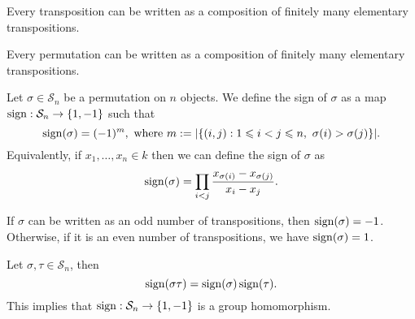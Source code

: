 \begin{proposition}
  Every transposition can be written as a composition of finitely many
  elementary transpositions.
\end{proposition}

\begin{corollary}
  Every permutation can be written as a composition of finitely many elementary
  transpositions.
\end{corollary}

\begin{definition}[Sign]
  \label{def: sign}
  Let \(\sigma \in \mathcal S_n\) be a permutation on \(n\) objects. We define
  the sign of \(\sigma\) as a map \(\operatorname{sign}: \mathcal S_n \to
  \{1, -1\}\) such that
  \[
    \operatorname{sign}(\sigma) = (-1)^m, \text{ where }
    m := |\{(i, j) : 1 \leqslant i < j \leqslant n,\ \sigma(i) > \sigma(j)\}|.
  \]
  Equivalently, if \(x_1, \dots, x_n \in k\) then we can define the
  sign of \(\sigma\) as
  \[
    \operatorname{sign}(\sigma) = \prod_{i < j} \frac{x_{\sigma(i)} -
    x_{\sigma(j)}}{x_i - x_j}.
  \]
\end{definition}

\begin{corollary}
  If \(\sigma\) can be written as an odd number of transpositions, then
  \(\operatorname{sign}(\sigma) = -1\). Otherwise, if it is an even number of
  transpositions, we have \(\operatorname{sign}(\sigma) = 1\).
\end{corollary}

\begin{proposition}\label{prop: sign is a group homomorphism}
  Let \(\sigma, \tau \in \mathcal S_n\), then
  \[
    \operatorname{sign}(\sigma \tau) = \operatorname{sign}(\sigma)
    \operatorname{sign}(\tau).
  \]
  This implies that \(\operatorname{sign}: \mathcal S_n \to \{1, -1\}\) is a
  group homomorphism.
\end{proposition}

